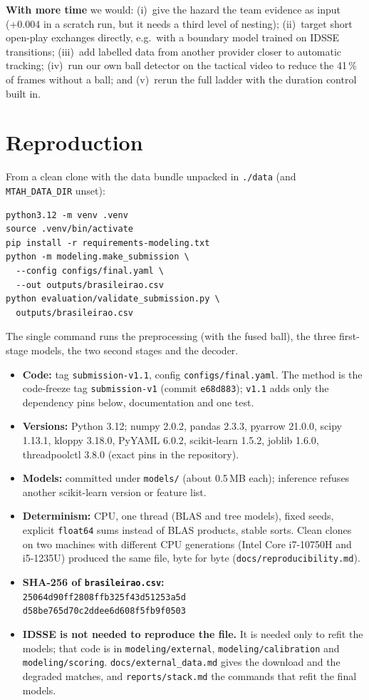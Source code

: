 \documentclass[journal]{IEEEtran}
\begin{document}
\textbf{With more time} we would: (i)~give the hazard the team evidence as input (+0.004 in a scratch run, but it needs a third level of nesting); (ii)~target short open-play exchanges directly, e.g.\ with a boundary model trained on IDSSE transitions; (iii)~add labelled data from another provider closer to automatic tracking; (iv)~run our own ball detector on the tactical video to reduce the 41\,\% of frames without a ball; and (v)~rerun the full ladder with the duration control built in.

\section{Reproduction}
\label{sec:repro}

From a clean clone with the data bundle unpacked in \texttt{./data} (and \texttt{MTAH\_DATA\_DIR} unset):
\begin{small}
\begin{verbatim}
python3.12 -m venv .venv
source .venv/bin/activate
pip install -r requirements-modeling.txt
python -m modeling.make_submission \
  --config configs/final.yaml \
  --out outputs/brasileirao.csv
python evaluation/validate_submission.py \
  outputs/brasileirao.csv
\end{verbatim}
\end{small}
The single command runs the preprocessing (with the fused ball), the three first-stage models, the two second stages and the decoder.
\begin{itemize}
\item \textbf{Code:} tag \texttt{submission-v1.1}, config \texttt{configs/final.yaml}. The method is the code-freeze tag \texttt{submission-v1} (commit \texttt{e68d883}); \texttt{v1.1} adds only the dependency pins below, documentation and one test.
\item \textbf{Versions:} Python 3.12; numpy 2.0.2, pandas 2.3.3, pyarrow 21.0.0, scipy 1.13.1, kloppy 3.18.0, PyYAML 6.0.2, scikit-learn 1.5.2, joblib 1.6.0, threadpoolctl 3.8.0 (exact pins in the repository).
\item \textbf{Models:} committed under \texttt{models/} (about 0.5\,MB each); inference refuses another scikit-learn version or feature list.
\item \textbf{Determinism:} CPU, one thread (BLAS and tree models), fixed seeds, explicit \texttt{float64} sums instead of BLAS products, stable sorts. Clean clones on two machines with different CPU generations (Intel Core i7-10750H and i5-1235U) produced the same file, byte for byte (\texttt{docs/reproducibility.md}).
\item \textbf{SHA-256 of \texttt{brasileirao.csv}:}\\ {\footnotesize\texttt{25064d90ff2808ffb325f43d51253a5d}\\\texttt{d58be765d70c2ddee6d608f5fb9f0503}}
\item \textbf{IDSSE is not needed to reproduce the file.} It is needed only to refit the models; that code is in \texttt{modeling/external}, \texttt{modeling/calibration} and \texttt{modeling/scoring}. \texttt{docs/external\_data.md} gives the download and the degraded matches, and \texttt{reports/stack.md} the commands that refit the final models.
\end{itemize}
\end{document}
